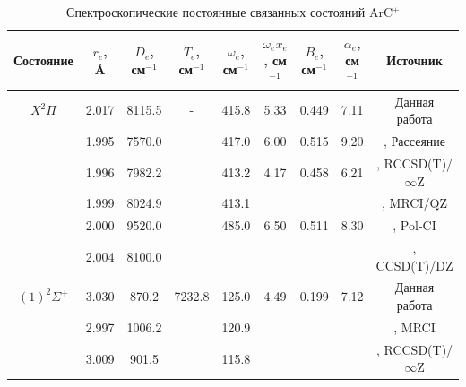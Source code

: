 \documentclass[12pt]{extarticle}
\begin{document}
    \begin{table}[H]
    	\centering
    	\small
    	\setlength{\tabcolsep}{3pt}
    	\caption{\label{tab:spectroscopic} Спектроскопические постоянные связанных состояний ArC$^{+}$}
    	\begin{tabular}{|c|c|c|c|c|c|c|c|c|}
    		\hline
    		Состояние & $r_e$, \AA & $D_e$, см$^{-1}$ & $T_e$, см$^{-1}$ & $\omega_e$, см$^{-1}$ & $\omega_e x_e$, см$^{-1}$ & $B_e$, см$^{-1}$ & $\alpha_e$, см$^{-1}$ & Источник                     \\ \hline
    		$X^2\Pi$                & 2.017            & 8115.5           & -                & 415.8                 & 5.33                      & 0.449            & 7.11                  & Данная работа                  \\
    		& 1.995            & 7570.0           &                  & 417.0                 & 6.00                      & 0.515            & 9.20                  & \cite{hillier}, Рассеяние   \\
    		& 1.996            & 7982.2           &                  & 413.2                 & 4.17                      & 0.458            & 6.21                  & \cite{tuttle}, RCCSD(T)/$\infty$Z \\
    		& 1.999            & 8024.9           &                  & 413.1                 &                           &                  &                       & \cite{tuttle}, MRCI/QZ       \\
    		& 2.000            & 9520.0           &                  & 485.0                 & 6.50                      & 0.511            & 8.30                  & \cite{hillier}, Pol-CI       \\
    		& 2.004            & 8100.0           &                  &                       &                           &                  &                       & \cite{froudakis}, CCSD(T)/DZ \\ \hline
    		$(1)^2\Sigma^+$         & 3.030            & 870.2            & 7232.8           & 125.0                 & 4.49                      & 0.199            & 7.12                  & Данная работа                  \\
    		& 2.997            & 1006.2           &                  & 120.9                 &                           &                  &                       & \cite{tuttle}, MRCI          \\
    		& 3.009            & 901.5            &                  & 115.8                 &                           &                  &                       & \cite{tuttle}, RCCSD(T)/$\infty$Z      \\ \hline

\end{tabular}
\end{table}
\end{document}
